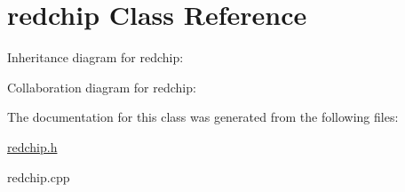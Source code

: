 \hypertarget{classredchip}{}\section{redchip Class Reference}
\label{classredchip}


Inheritance diagram for redchip\+:


Collaboration diagram for redchip\+:


The documentation for this class was generated from the following files\+:\begin{DoxyCompactItemize}
\item 
\hyperlink{redchip_8h}{redchip.\+h}\item 
redchip.\+cpp\end{DoxyCompactItemize}
